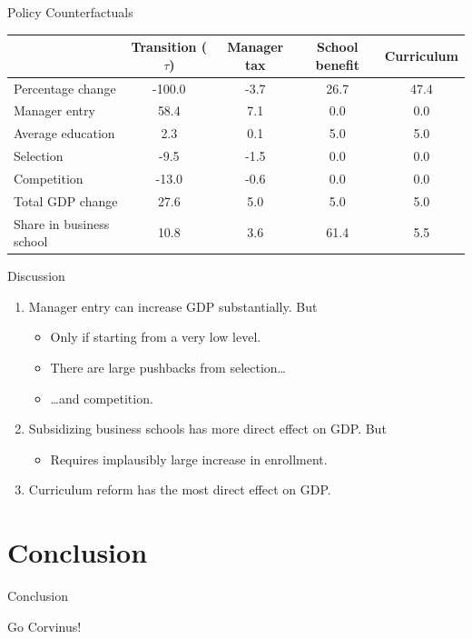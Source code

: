 \documentclass[
  ignorenonframetext,
  aspectratio=1610,
]{beamer}
\providecommand{\tightlist}{%
  \setlength{\itemsep}{0pt}\setlength{\parskip}{0pt}}
\begin{document}
\begin{frame}{Policy Counterfactuals}
\protect\hypertarget{policy-counterfactuals-1}{}
\begin{tabular}{lcccc}
\toprule
{} & Transition ($\tau$) & Manager tax & School benefit & Curriculum \\
\midrule
Percentage change        &         -100.0 &        -3.7 &       26.7 &           47.4 \\
Manager entry            &           58.4 &         7.1 &         0.0 &            0.0 \\
Average education        &            2.3 &         0.1 &         5.0 &            5.0 \\
Selection                &           -9.5 &        -1.5 &         0.0 &            0.0 \\
Competition              &          -13.0 &        -0.6 &         0.0 &            0.0 \\
\midrule
Total GDP change         &           27.6 &         5.0 &         5.0 &            5.0 \\
\midrule
Share in business school &          10.8 &       3.6 &       61.4 &          5.5 \\
\bottomrule
\end{tabular}
\end{frame}

\begin{frame}{Discussion}
\protect\hypertarget{discussion}{}
\begin{enumerate}
\tightlist
\item
  Manager entry can increase GDP substantially. But

  \begin{itemize}
  \tightlist
  \item
    Only if starting from a very low level.
  \item
    There are large pushbacks from selection\ldots{}
  \item
    \ldots and competition.
  \end{itemize}
\item
  Subsidizing business schools has more direct effect on GDP. But

  \begin{itemize}
  \tightlist
  \item
    Requires implausibly large increase in enrollment.
  \end{itemize}
\item
  Curriculum reform has the most direct effect on GDP.
\end{enumerate}
\end{frame}

\section{Conclusion}\label{conclusion}

\begin{frame}{Conclusion}
\protect\hypertarget{conclusion-1}{}
\begin{block}{Go Corvinus!}
\protect\hypertarget{go-corvinus}{}
\end{block}
\end{frame}
\end{document}
